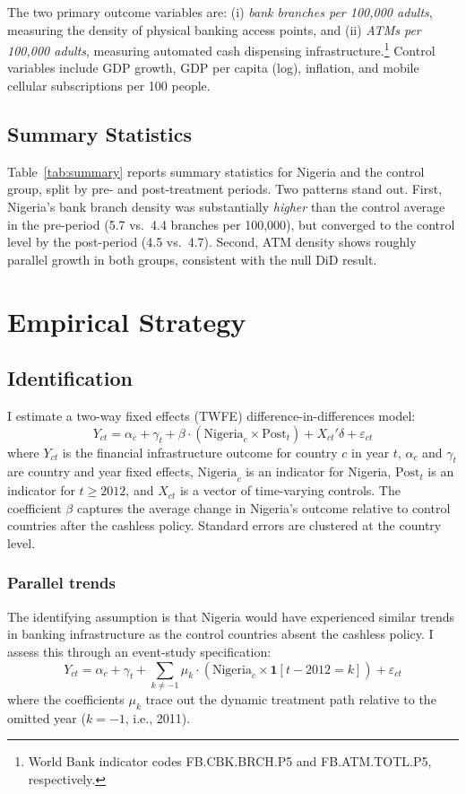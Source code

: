 \documentclass[12pt]{article}
\begin{document}
The two primary outcome variables are: (i) \textit{bank branches per 100,000 adults}, measuring the density of physical banking access points, and (ii) \textit{ATMs per 100,000 adults}, measuring automated cash dispensing infrastructure.\footnote{World Bank indicator codes FB.CBK.BRCH.P5 and FB.ATM.TOTL.P5, respectively.} Control variables include GDP growth, GDP per capita (log), inflation, and mobile cellular subscriptions per 100 people.

\subsection{Summary Statistics}



Table~\ref{tab:summary} reports summary statistics for Nigeria and the control group, split by pre- and post-treatment periods. Two patterns stand out. First, Nigeria's bank branch density was substantially \textit{higher} than the control average in the pre-period (5.7 vs.\ 4.4 branches per 100,000), but converged to the control level by the post-period (4.5 vs.\ 4.7). Second, ATM density shows roughly parallel growth in both groups, consistent with the null DiD result.

\section{Empirical Strategy}

\subsection{Identification}

I estimate a two-way fixed effects (TWFE) difference-in-differences model:
\begin{equation}
Y_{ct} = \alpha_c + \gamma_t + \beta \cdot (\text{Nigeria}_c \times \text{Post}_t) + X_{ct}'\delta + \varepsilon_{ct}
\end{equation}
where $Y_{ct}$ is the financial infrastructure outcome for country $c$ in year $t$, $\alpha_c$ and $\gamma_t$ are country and year fixed effects, $\text{Nigeria}_c$ is an indicator for Nigeria, $\text{Post}_t$ is an indicator for $t \geq 2012$, and $X_{ct}$ is a vector of time-varying controls. The coefficient $\beta$ captures the average change in Nigeria's outcome relative to control countries after the cashless policy. Standard errors are clustered at the country level.

\subsubsection*{Parallel trends} The identifying assumption is that Nigeria would have experienced similar trends in banking infrastructure as the control countries absent the cashless policy. I assess this through an event-study specification:
\begin{equation}
Y_{ct} = \alpha_c + \gamma_t + \sum_{k \neq -1} \mu_k \cdot (\text{Nigeria}_c \times \mathbf{1}[t - 2012 = k]) + \varepsilon_{ct}
\end{equation}
where the coefficients $\mu_k$ trace out the dynamic treatment path relative to the omitted year ($k = -1$, i.e., 2011).
\end{document}
